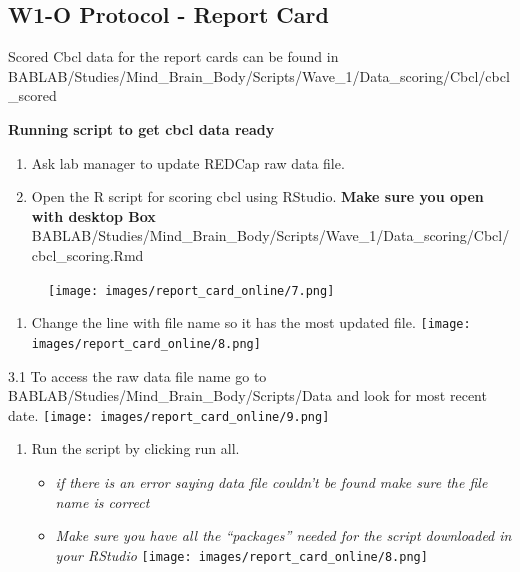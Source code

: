 \documentclass[
]{book}
\providecommand{\tightlist}{%
  \setlength{\itemsep}{0pt}\setlength{\parskip}{0pt}}
\begin{document}
\hypertarget{w1-o-protocol---report-card}{%
\subsection{W1-O Protocol - Report Card}\label{w1-o-protocol---report-card}}

Scored Cbcl data for the report cards can be found in BABLAB/Studies/Mind\_Brain\_Body/Scripts/Wave\_1/Data\_scoring/Cbcl/cbcl\_scored

\textbf{Running script to get cbcl data ready}

\begin{enumerate}
\def\labelenumi{\arabic{enumi}.}
\item
  Ask lab manager to update REDCap raw data file.
\item
  Open the R script for scoring cbcl using RStudio. \textbf{Make sure you open with desktop Box} BABLAB/Studies/Mind\_Brain\_Body/Scripts/Wave\_1/Data\_scoring/Cbcl/cbcl\_scoring.Rmd
\end{enumerate}

\begin{figure}
\centering
\texttt{[image: images/report\_card\_online/7.png]}
\caption{}
\end{figure}

\begin{enumerate}
\def\labelenumi{\arabic{enumi}.}
\setcounter{enumi}{2}
\tightlist
\item
  Change the line with file name so it has the most updated file.
  \texttt{[image: images/report\_card\_online/8.png]}
\end{enumerate}

3.1 To access the raw data file name go to BABLAB/Studies/Mind\_Brain\_Body/Scripts/Data and look for most recent date.
\texttt{[image: images/report\_card\_online/9.png]}

\begin{enumerate}
\def\labelenumi{\arabic{enumi}.}
\setcounter{enumi}{3}
\tightlist
\item
  Run the script by clicking run all.

  \begin{itemize}
  \tightlist
  \item
    \emph{if there is an error saying data file couldn't be found make sure the file name is correct}
  \item
    \emph{Make sure you have all the ``packages'' needed for the script downloaded in your RStudio}
    \texttt{[image: images/report\_card\_online/8.png]}
  \end{itemize}
\end{enumerate}
\end{document}
